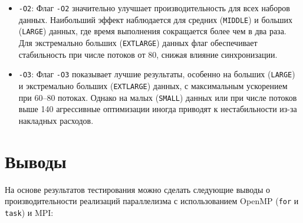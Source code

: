 \documentclass[a4paper, 11pt]{article}
\begin{document}
\begin{itemize}
    \item \texttt{-O2}: Флаг \texttt{-O2} значительно улучшает производительность для всех наборов данных. Наибольший эффект наблюдается для средних (\texttt{MIDDLE}) и больших (\texttt{LARGE}) данных, где время выполнения сокращается более чем в два раза. Для экстремально больших (\texttt{EXTLARGE}) данных флаг обеспечивает стабильность при числе потоков от 80, снижая влияние синхронизации.

    \item \texttt{-O3}: Флаг \texttt{-O3} показывает лучшие результаты, особенно на больших (\texttt{LARGE}) и экстремально больших (\texttt{EXTLARGE}) данных, с максимальным ускорением при 60–80 потоках. Однако на малых (\texttt{SMALL}) данных или при числе потоков выше 140 агрессивные оптимизации иногда приводят к нестабильности из-за накладных расходов.
\end{itemize}
\newpage

\section*{Выводы}
На основе результатов тестирования можно сделать следующие выводы о производительности реализаций параллелизма с использованием OpenMP (\texttt{for} и \texttt{task}) и MPI:
\end{document}
